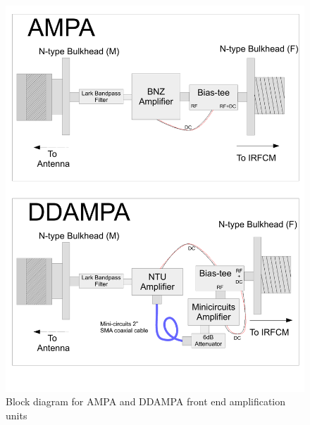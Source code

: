 \begin{figure}
\centering
	\includegraphics[width=\textwidth]{figures/AmpaDDampaBlock}
	\caption{Block diagram for AMPA and DDAMPA front end amplification units}
	\label{fig:AmpaDDampaBlock}
\end{figure}

